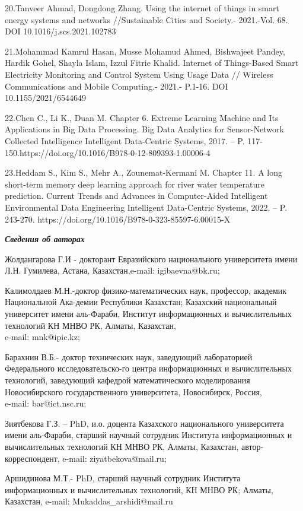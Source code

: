 \begin{noparindent}
20.Tanveer Ahmad, Dongdong Zhang. Using the internet of things in smart
energy systems and networks //Sustainable Cities and Society.-
2021.-Vol. 68. DOI 10.1016/j.scs.2021.102783

21.Mohammad Kamrul Hasan, Musse Mohamud Ahmed, Bishwajeet Pandey, Hardik
Gohel, Shayla Islam, Izzul Fitrie Khalid. Internet of Things-Based Smart
Electricity Monitoring and Control System Using Usage Data // Wireless
Communications and Mobile Computing.- 2021.- P.1-16. DOI 10.1155/2021/6544649

22.Chen C., Li K., Duan M. Chapter 6. Extreme Learning Machine and Its
Applications in Big Data Processing. Big Data Analytics for
Sensor-Network Collected Intelligence Intelligent Data-Centric Systems,
2017. -- P. 117-150.https://doi.org/10.1016/B978-0-12-809393-1.00006-4

23.Heddam S., Kim S., Mehr A., Zounemat-Kermani M. Chapter 11. A long
short-term memory deep learning approach for river water temperature
prediction. Current Trends and Advances in Computer-Aided Intelligent
Environmental Data Engineering Intelligent Data-Centric Systems, 2022.
-- P. 243-270. https://doi.org/10.1016/B978-0-323-85597-6.00015-X
\end{noparindent}


\emph{{\bfseries Сведения об авторах}}

\begin{noparindent}

Жолдангарова Г.И - докторант Евразийского национального университета
имени Л.Н. Гумилева, Астана, Казахстан,e-mail: igibaevna@bk.ru;

Калимолдаев М.Н.-доктор физико-математических наук, профессор, академик
Национальной Ака-демии Республики Казахстан; Казахский национальный
университет имени аль-Фараби, Институт информационных и вычислительных
технологий КН МНВО РК, Алматы, Казахстан,\\ e-mail: mnk@ipic.kz;

Барахнин В.Б.- доктор технических наук, заведующий лабораторией
Федерального исследовательско-го центра информационных и вычислительных
технологий, заведующий кафедрой математического моделирования
Новосибирского государственного университета, Новосибирск, Россия,
\\e-mail: bar@ict.nsc.ru;

Зиятбекова Г.З. -- PhD, и.о. доцента Казахского национального
университета имени аль-Фараби, старший научный сотрудник Института
информационных и вычислительных технологий КН МНВО РК, Алматы,
Казахстан, автор-корреспондент, e-mail: ziyatbekova@mail.ru;

Аршидинова М.Т.- PhD, старший научный сотрудник Института информационных
и вычислительных технологий, КН МНВО РК; Алматы, Казахстан, e-mail:
Mukaddas\_arshidi@mail.ru
\end{noparindent}

